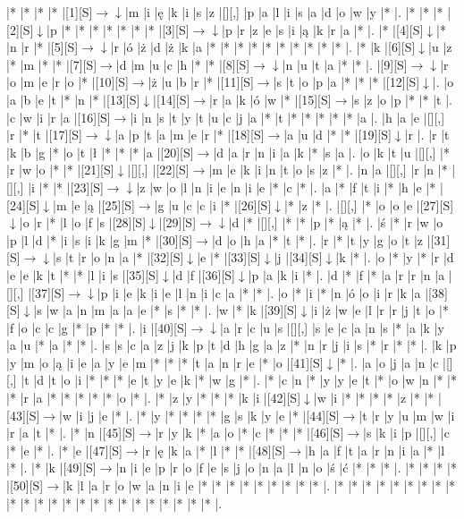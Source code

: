 \documentclass[11pt]{article}
\newcommand\drarr{$\rightarrow \!\!\!\!\! \downarrow$}
\newcommand\rarr{$\rightarrow$}
\newcommand\darr{$\downarrow$}
\begin{document}
\noindent\begin{Puzzle}{23}{30}|*	|*	|*	|*	|[1][S]\drarr	|m	|i	|ę	|k	|i	|s	|z	|[][,]{ }	|p	|a	|l	|i	|s	|a	|d	|o	|w	|y	|*	|.
|*	|*	|*	|[2][S]\darr	|p	|*	|*	|*	|*	|*	|*	|*	|[3][S]\drarr	|p	|r	|z	|e	|s	|i	|ą	|k	|r	|a	|*	|.
|*	|[4][S]\darr	|*	|n	|r	|*	|[5][S]\drarr	|r	|ó	|ż	|d	|ż	|k	|a	|*	|*	|*	|*	|*	|*	|*	|*	|*	|*	|.
|*	|k	|[6][S]\darr	|u	|z	|*	|m	|*	|*	|[7][S]\rarr	|d	|m	|u	|c	|h	|*	|*	|[8][S]\drarr	|n	|u	|t	|a	|*	|*	|.
|[9][S]\drarr	|r	|o	|m	|e	|r	|o	|*	|[10][S]\rarr	|ż	|u	|b	|r	|*	|[11][S]\rarr	|s	|t	|o	|p	|a	|*	|*	|*	|[12][S]\darr	|.
|o	|a	|b	|e	|t	|*	|n	|*	|[13][S]\darr	|[14][S]\rarr	|r	|a	|k	|ó	|w	|*	|[15][S]\rarr	|s	|z	|o	|p	|*	|*	|t	|.
|c	|w	|i	|r	|a	|[16][S]\rarr	|i	|n	|s	|t	|y	|t	|u	|c	|j	|a	|*	|t	|*	|*	|*	|*	|*	|a	|.
|h	|a	|e	|[][,]{ }	|r	|*	|t	|[17][S]\drarr	|a	|p	|t	|a	|m	|e	|r	|*	|[18][S]\rarr	|a	|u	|d	|*	|*	|[19][S]\darr	|r	|.
|r	|t	|k	|b	|g	|*	|o	|t	|ł	|*	|*	|*	|a	|[20][S]\rarr	|d	|a	|r	|n	|i	|a	|k	|*	|s	|a	|.
|o	|k	|t	|u	|[][,]{ }	|*	|r	|w	|o	|*	|*	|[21][S]\darr	|[][,]{ }	|[22][S]\rarr	|m	|e	|k	|i	|n	|t	|o	|s	|z	|*	|.
|n	|a	|[][,]{ }	|r	|n	|*	|[][,]{ }	|i	|*	|*	|[23][S]\drarr	|z	|w	|o	|l	|n	|i	|e	|n	|i	|e	|*	|c	|*	|.
|a	|*	|f	|t	|i	|*	|h	|e	|*	|[24][S]\darr	|m	|e	|ą	|[25][S]\rarr	|g	|u	|c	|c	|i	|*	|[26][S]\darr	|*	|z	|*	|.
|[][,]{ }	|*	|o	|o	|e	|[27][S]\darr	|o	|r	|*	|l	|o	|f	|s	|[28][S]\darr	|[29][S]\drarr	|d	|*	|[][,]{ }	|*	|*	|p	|*	|ą	|*	|.
|ś	|*	|r	|w	|o	|p	|l	|d	|*	|i	|s	|i	|k	|g	|m	|*	|[30][S]\rarr	|d	|o	|h	|a	|*	|t	|*	|.
|r	|*	|t	|y	|g	|o	|t	|z	|[31][S]\drarr	|s	|t	|r	|o	|n	|a	|*	|[32][S]\darr	|e	|*	|[33][S]\darr	|j	|[34][S]\darr	|k	|*	|.
|o	|*	|y	|*	|r	|d	|e	|e	|k	|t	|*	|*	|l	|i	|s	|[35][S]\darr	|d	|f	|[36][S]\darr	|p	|a	|k	|i	|*	|.
|d	|*	|f	|*	|a	|r	|r	|n	|a	|[][,]{ }	|[37][S]\drarr	|p	|i	|e	|k	|i	|e	|l	|n	|i	|c	|a	|*	|*	|.
|o	|*	|i	|*	|n	|ó	|o	|i	|r	|k	|a	|[38][S]\darr	|s	|w	|a	|n	|m	|a	|a	|e	|*	|s	|*	|*	|.
|w	|*	|k	|[39][S]\darr	|i	|ż	|w	|e	|l	|r	|r	|j	|t	|o	|*	|f	|o	|c	|c	|g	|*	|p	|*	|*	|.
|i	|[40][S]\drarr	|a	|r	|c	|u	|s	|[][,]{ }	|s	|e	|c	|a	|n	|s	|*	|a	|k	|y	|a	|u	|*	|a	|*	|*	|.
|s	|s	|c	|a	|z	|j	|k	|p	|t	|d	|h	|g	|a	|z	|*	|n	|r	|j	|i	|s	|*	|r	|*	|*	|.
|k	|p	|y	|m	|o	|ą	|i	|e	|a	|y	|e	|m	|*	|*	|*	|t	|a	|n	|r	|e	|*	|o	|[41][S]\darr	|*	|.
|a	|o	|j	|a	|n	|c	|[][,]{ }	|t	|d	|t	|o	|i	|*	|*	|*	|e	|t	|y	|e	|k	|*	|w	|g	|*	|.
|*	|c	|n	|*	|y	|y	|e	|t	|*	|o	|w	|n	|*	|*	|*	|r	|a	|*	|*	|*	|*	|*	|o	|*	|.
|*	|z	|y	|*	|*	|*	|k	|i	|[42][S]\darr	|w	|i	|*	|*	|*	|*	|z	|*	|*	|[43][S]\rarr	|w	|i	|j	|e	|*	|.
|*	|y	|*	|*	|*	|*	|g	|s	|k	|y	|e	|*	|[44][S]\rarr	|t	|r	|y	|u	|m	|w	|i	|r	|a	|t	|*	|.
|*	|n	|[45][S]\rarr	|r	|y	|k	|*	|a	|o	|*	|c	|*	|*	|*	|[46][S]\rarr	|s	|k	|i	|p	|[][,]{ }	|c	|*	|e	|*	|.
|*	|e	|[47][S]\rarr	|r	|ę	|k	|a	|*	|l	|*	|*	|[48][S]\rarr	|h	|a	|f	|t	|a	|r	|n	|i	|a	|*	|l	|*	|.
|*	|k	|[49][S]\rarr	|n	|i	|e	|p	|r	|o	|f	|e	|s	|j	|o	|n	|a	|l	|n	|o	|ś	|ć	|*	|*	|*	|.
|*	|*	|*	|*	|[50][S]\rarr	|k	|l	|a	|r	|o	|w	|a	|n	|i	|e	|*	|*	|*	|*	|*	|*	|*	|*	|*	|.
|*	|*	|*	|*	|*	|*	|*	|*	|*	|*	|*	|*	|*	|*	|*	|*	|*	|*	|*	|*	|*	|*	|*	|*	|.\end{Puzzle}
\end{document}
